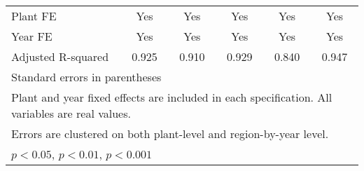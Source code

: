 \begin{table}[htbp]
\begin{tabular}{l*{5}{c}}
Plant FE        &      Yes         &      Yes         &      Yes         &      Yes         &      Yes         \\
Year FE         &      Yes         &      Yes         &      Yes         &      Yes         &      Yes         \\
Adjusted R-squared&    0.925         &    0.910         &    0.929         &    0.840         &    0.947         \\
\bottomrule
\multicolumn{6}{l}{\footnotesize Standard errors in parentheses}\\
\multicolumn{6}{l}{\footnotesize Plant and year fixed effects are included in each specification. All variables are real values.}\\
\multicolumn{6}{l}{\footnotesize Errors are clustered on both plant-level and region-by-year level. }\\
\multicolumn{6}{l}{\footnotesize \sym{*} \(p<0.05\), \sym{**} \(p<0.01\), \sym{***} \(p<0.001\)}\\
\end{tabular}
\end{table}
